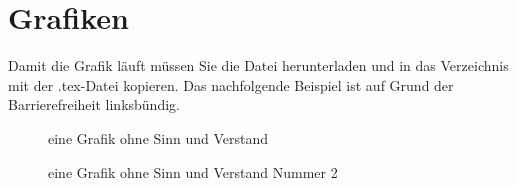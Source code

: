 \section{Grafiken}

Damit die Grafik läuft müssen Sie die Datei herunterladen und in das Verzeichnis mit der .tex-Datei kopieren. Das nachfolgende Beispiel ist auf Grund der Barrierefreiheit linksbündig.

\begin{figure}[htbp]


\caption{eine Grafik ohne Sinn und Verstand}

\end{figure}

\begin{figure}[htbp]


\caption{eine Grafik ohne Sinn und Verstand Nummer 2}

\end{figure}


